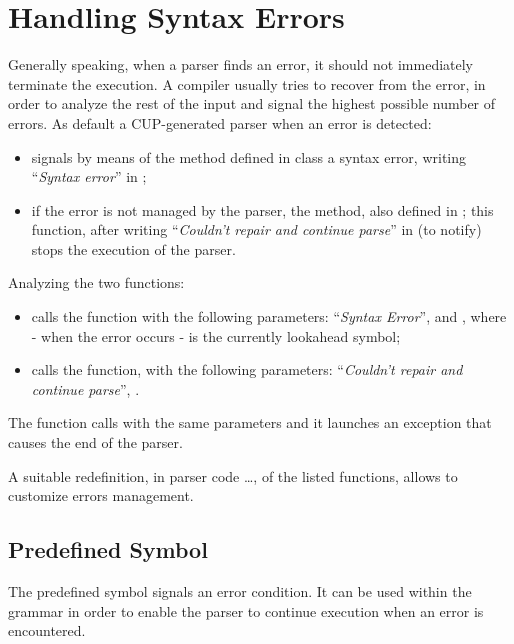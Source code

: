 \section{Handling Syntax Errors}
Generally speaking, when a parser finds an error, it should not immediately terminate the execution.
A compiler usually tries to recover from the error, in order to analyze the rest of the input and signal the highest possible number of errors.
As default a CUP-generated parser when an error is detected:
\begin{itemize}
    \item
    signals by means of the method  defined in  class a syntax error, writing ``\emph{Syntax error}'' in ;
    \item
    if the error is not managed by the parser, the  method, also defined in ; this function, after writing ``\emph{Couldn't repair and continue parse}'' in  (to notify) stops the execution of the parser.
\end{itemize}

Analyzing the two functions:
\begin{itemize}
    \item
     calls the function  with the following parameters: ``\emph{Syntax Error}'', and , where - when the error occurs -  is the currently lookahead symbol;
    \item
     calls the function, with the following parameters: ``\emph{Couldn't repair and continue parse}'', .
\end{itemize}
The  function calls with the same parameters  and it launches an exception that causes the end of the parser.

A suitable redefinition, in parser code \code{\{:}\ldots\code{:\}}, of the listed functions, allows to customize errors management.

\subsection{ Predefined Symbol}
The  predefined symbol signals an error condition.
It can be used within the grammar in order to enable the parser to continue execution when an error is encountered.


